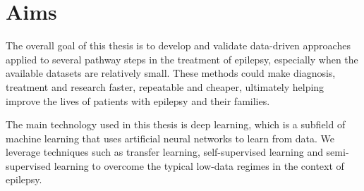 \section{Aims}

The overall goal of this thesis is to develop and validate data-driven approaches applied to several pathway steps in the treatment of epilepsy, especially when the available datasets are relatively small.
These methods could make diagnosis, treatment and research faster, repeatable and cheaper, ultimately helping improve the lives of patients with epilepsy and their families.

The main technology used in this thesis is deep learning, which is a subfield of machine learning that uses artificial neural networks to learn from data.
We leverage techniques such as transfer learning, self-supervised learning and semi-supervised learning to overcome the typical low-data regimes in the context of epilepsy.
